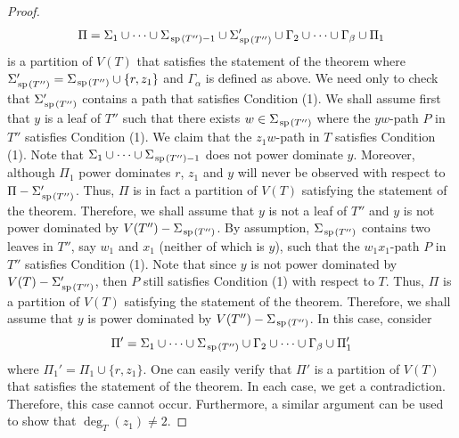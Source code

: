 \documentclass[11pt]{article}
\newcommand{\spider}{\hskip1pt \textrm{sp} \hskip1pt}
\begin{document}
\begin{proof}
\[\Pi = \Sigma_1 \cup \cdots \cup \Sigma_{\spider(T'') -1} \cup \Sigma_{\spider(T'')}' \cup \Gamma_2 \cup \cdots \cup \Gamma_{\beta} \cup \Pi_1\] is a partition of $V(T)$ that satisfies the statement of the theorem where $\Sigma_{\spider(T'')}' = \Sigma_{\spider(T'')} \cup \{r, z_1\}$ and $\Gamma_{\alpha}$ is defined as above. We need only to check that $\Sigma'_{\spider(T'')}$ contains a path that satisfies Condition (1). We shall assume first that $y$ is a leaf of $T''$ such that there exists $w \in \Sigma_{\spider(T'')}$ where the $yw$-path $P$ in $T''$ satisfies Condition (1). We claim that the $z_1w$-path in $T$ satisfies Condition (1). Note that $\Sigma_1 \cup \cdots \cup \Sigma_{\spider(T'')-1}$ does not power dominate $y$. Moreover, although $\Pi_1$ power dominates $r$, $z_1$ and $y$ will never be observed with respect to $\Pi - \Sigma'_{\spider(T'')}$. Thus, $\Pi$ is in fact a partition of $V(T)$ satisfying the statement of the theorem. Therefore, we shall assume that $y$ is not a leaf of $T''$ and $y$ is not power dominated by $V(T'') - \Sigma_{\spider(T'')}$. By assumption, $\Sigma_{\spider(T'')}$ contains two leaves in $T''$, say $w_1$ and $x_1$ (neither of which is $y$), such that the $w_1x_1$-path $P$ in $T''$ satisfies Condition (1). Note that since $y$ is not power dominated by $V(T) - \Sigma'_{\spider(T'')}$, then $P$ still satisfies Condition (1) with respect to $T$. Thus, $\Pi$ is a partition of $V(T)$ satisfying the statement of the theorem. Therefore, we shall assume that $y$ is power dominated by $V(T'') - \Sigma_{\spider(T'')}$. In this case, consider 
\[\Pi' = \Sigma_1 \cup \cdots  \cup \Sigma_{\spider(T'')}\cup \Gamma_2 \cup \cdots \cup \Gamma_{\beta} \cup \Pi'_1\] 
where $\Pi_1' = \Pi_1 \cup \{r, z_1\}$. One can easily verify that $\Pi'$ is a partition of $V(T)$ that satisfies the statement of the theorem. In each case, we get a contradiction. Therefore, this case cannot occur. Furthermore, a similar argument can be used to show that $\deg_T(z_1) \ne 2$. 



\end{proof}
\end{document}
